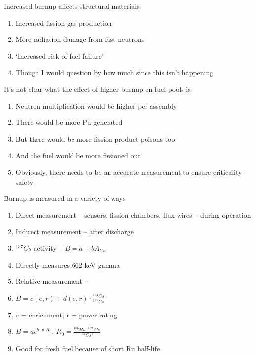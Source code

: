 \documentclass[aspectratio=1610,pdftex,dvipsnames,compress,xcolor={dvipsnames}]{beamer}
\begin{document}
\begin{frame}{Increased burnup affects structural materials}
    \begin{enumerate}[resume=blue,topsep=0pt,itemsep=21pt,leftmargin=*,label=(\arabic*)]
        \item[]Increased fission gas production
        \item[]More radiation damage from fast neutrons
        \item[]`Increased risk of fuel failure'
        \item[]Though I would question by how much since this isn't happening
    \end{enumerate}
\end{frame}


\begin{frame}{It's not clear what the effect of higher burnup on fuel pools is}
    \begin{enumerate}[series=outerlist,topsep=0pt,itemsep=21pt,leftmargin=*,label=(\arabic*)]
        \item[]Neutron multiplication would be higher per assembly
        \item[]There would be more Pu generated
        \item[]But there would be more fission product poisons too
        \item[]And the fuel would be more fissioned out
        \item[]Obviously, there needs to be an accurate measurement to ensure criticality safety
    \end{enumerate}
\end{frame}


\begin{frame}{Burnup is measured in a variety of ways}
    \begin{enumerate}[series=outerlist,topsep=0pt,itemsep=5pt,leftmargin=*,label=(\arabic*)]
        \item[]Direct measurement -- sensors, fission chambers, flux wires -- during operation
        \item[]Indirect measurement -- after discharge
            \vspace{0.10in}
        \item[]$^{137}Cs$ activity -- $B=a+bA_{Cs}$
        \item[]Directly measures 662 keV gamma
            \vspace{0.10in}
        \item[]Relative measurement --
        \item[]$B=c(e,r)+d(e,r) \cdot \frac{^{134}Cs}{^{137}Cs}$
        \item[]e = enrichment; r = power rating
            \vspace{0.10in}
        \item[]$B=ae^{b\ln{R_0}}$, $R_0=\frac{^{106}Ru\cdot ^{137}Cs}{^{134}Cs^2}$
        \item[]Good for fresh fuel because of short Ru half-life
    \end{enumerate}
\end{frame}
\end{document}
